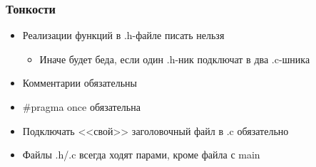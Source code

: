 \documentclass{../../slides-style}
\begin{document}
    \begin{frame}
        \frametitle{Тонкости}
        \begin{itemize}
            \item Реализации функций в .h-файле писать нельзя
            \begin{itemize}
                \item Иначе будет беда, если один .h-ник подключат в два .c-шника
            \end{itemize}
            \item Комментарии обязательны
            \item \#pragma once обязательна
            \item Подключать <<свой>> заголовочный файл в .c обязательно
            \item Файлы .h/.c всегда ходят парами, кроме файла с main
        \end{itemize}
    \end{frame}
\end{document}
